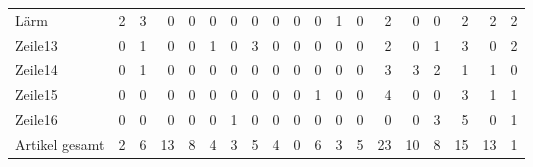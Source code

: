 \documentclass[twoside,paper=a4,usegeometry,index=totoc]{scrartcl}
\begin{document}
\begin{figure}[p]
\begin{figure}[p]
{\begin{tabular}{l*{18}r}
Lärm    & 2 & 3 & 0 & 0 & 0 & 0 & 0 & 0 & 0 & 0 & 1 & 0 & 2 & 0 & 0 & 2 & 2 & 2\\\addlinespace[3pt]
Zeile13 & 0 & 1 & 0 & 0 & 1 & 0 & 3 & 0 & 0 & 0 & 0 & 0 & 2 & 0 & 1 & 3 & 0 & 2\\\addlinespace[3pt]
Zeile14 & 0 & 1 & 0 & 0 & 0 & 0 & 0 & 0 & 0 & 0 & 0 & 0 & 3 & 3 & 2 & 1 & 1 & 0\\\addlinespace[3pt]
Zeile15 & 0 & 0 & 0 & 0 & 0 & 0 & 0 & 0 & 0 & 1 & 0 & 0 & 4 & 0 & 0 & 3 & 1 & 1\\\addlinespace[3pt]
Zeile16 & 0 & 0 & 0 & 0 & 0 & 1 & 0 & 0 & 0 & 0 & 0 & 0 & 0 & 0 & 3 & 5 & 0 & 1\\\addlinespace[3pt]\midrule
Artikel gesamt & 2 & 6 & 13 & 8 & 4 & 3 & 5 & 4 & 0 & 6 & 3 & 5 &23 &10 & 8 & 15 & 13 &1 \\
\bottomrule
\end{tabular}}



\end{figure}
\end{figure}
\end{document}
